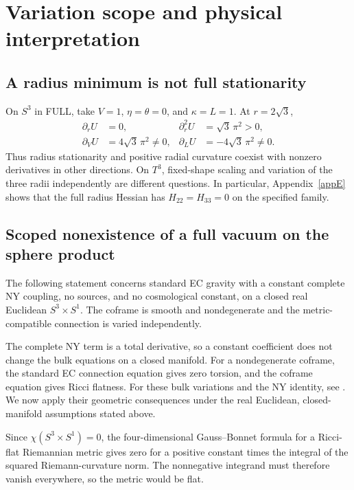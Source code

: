 \section{Variation scope and physical interpretation}\label{sec7}
\subsection{A radius minimum is not full stationarity}
On $S^3$ in FULL, take $V=1$, $\eta=\theta=0$, and $\kappa=L=1$.
At $r=2\sqrt3$,
\begin{equation}
\begin{aligned}
\partial_r U&=0,&\partial_r^2U&=\sqrt3\,\pi^2>0,\\
\partial_V U&=4\sqrt3\,\pi^2\ne0,
&\partial_L U&=-4\sqrt3\,\pi^2\ne0.
\end{aligned}
\tag{M7-01}\label{eq:M7-01}
\end{equation}
Thus radius stationarity and positive radial curvature coexist with
nonzero derivatives in other directions.
On $T^3$, fixed-shape scaling and variation of the three radii independently
are different questions. In particular, Appendix~\ref{appE} shows that
the full radius Hessian has $H_{22}=H_{33}=0$ on the specified family.

\subsection{Scoped nonexistence of a full vacuum on the sphere product}
The following statement concerns standard EC gravity with a constant
complete NY coupling, no sources, and no cosmological constant,
on a closed real Euclidean $S^3\times S^1$.
The coframe is smooth and nondegenerate and the metric-compatible
connection is varied independently.

The complete NY term is a total derivative, so a constant coefficient
does not change the bulk equations on a closed manifold.
For a nondegenerate coframe, the standard EC connection equation gives
zero torsion, and the coframe equation gives Ricci flatness.
For these bulk variations and the NY identity, see
\cite[Sec.~IV.A--B, Eqs.~(4.10)--(4.12), (4.20)]{Corichi2016}.
We now apply their geometric consequences under the real Euclidean,
closed-manifold assumptions stated above.

Since $\chi(S^3\times S^1)=0$, the four-dimensional Gauss--Bonnet
formula for a Ricci-flat Riemannian metric gives zero for a positive
constant times the integral of the squared Riemann-curvature norm.
The nonnegative integrand must therefore vanish everywhere, so the
metric would be flat.

